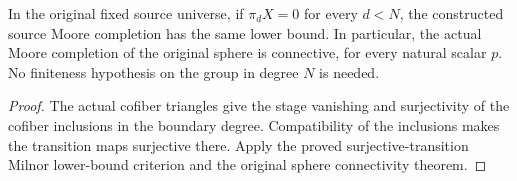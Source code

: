 \begin{proposition}
  \label{prop:actual-source-moore-connectivity}
  \leanok
  In the original fixed source universe, if $\pi_d X=0$ for every $d<N$, the constructed source Moore completion has the same lower bound. In particular, the actual Moore completion of the original sphere is connective, for every natural scalar $p$. No finiteness hypothesis on the group in degree $N$ is needed.
\end{proposition}
\begin{proof}
  The actual cofiber triangles give the stage vanishing and surjectivity of the cofiber inclusions in the boundary degree. Compatibility of the inclusions makes the transition maps surjective there. Apply the proved surjective-transition Milnor lower-bound criterion and the original sphere connectivity theorem.
  \leanok
\end{proof}

